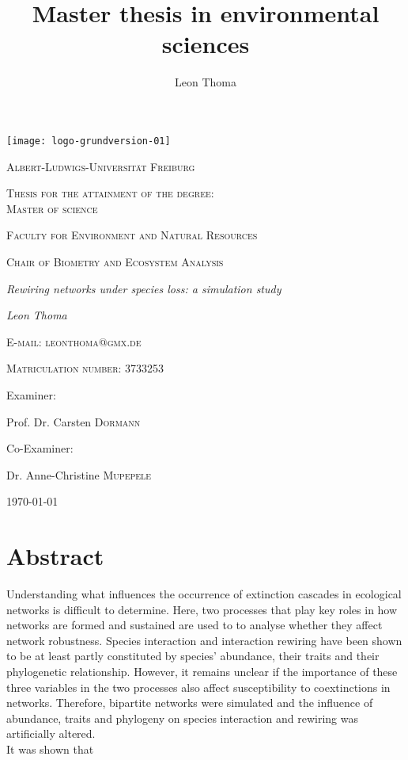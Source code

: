 \documentclass[12pt,a4paper]{article}
\author{Leon Thoma}
\title{Master thesis in environmental sciences}
\begin{document}
\begin{titlepage}
	\centering
	\texttt{[image: logo-grundversion-01]}\par\vspace{1cm}
	{\scshape\large Albert-Ludwigs-Universität Freiburg\par}
	\vspace{1.25cm}
	{\scshape\large Thesis for the attainment of the degree:\\ Master of science\par}
	\vspace{.75cm}
	{\scshape\large Faculty for Environment and Natural Resources\par}
	\vspace{.75cm}
	{\scshape\large Chair of Biometry and Ecosystem Analysis\par}
	\vspace{.75cm}
	{\Large\itshape Rewiring networks under species loss: a simulation
study
\par}
	\vspace{.75cm}
	{\Large\itshape Leon Thoma\par}
	\vspace{.25cm}
	{\scshape\normalsize E-mail: leonthoma@gmx.de\par}
	\vspace{.15cm}
	{\scshape\normalsize Matriculation number: 3733253\par}
	\vspace{.75cm}
	\large Examiner:\par
	\large Prof. Dr. Carsten  \textsc{Dormann} \par
	\vspace{.5cm}
	\large Co-Examiner:\par
	\large Dr. Anne-Christine \textsc{Mupepele}
	\vfill

	{\large \today\par}
\end{titlepage}
	\tableofcontents
	\newpage	
	
\listoffigures
\listoftables
\newpage
	\section{Abstract} 
% 

Understanding what influences the occurrence of extinction cascades in ecological networks is difficult to determine. Here, two processes that play key roles in how networks are formed and sustained are used to to analyse whether they affect network robustness. Species interaction and interaction rewiring have been shown to be at least partly constituted by species' abundance, their traits and their phylogenetic relationship. However, it remains unclear if the importance of these three variables in the two processes also affect susceptibility to coextinctions in networks. Therefore, bipartite networks were simulated and the influence of abundance, traits and phylogeny on species interaction and rewiring was artificially altered.\\ It was shown that
\end{document}
